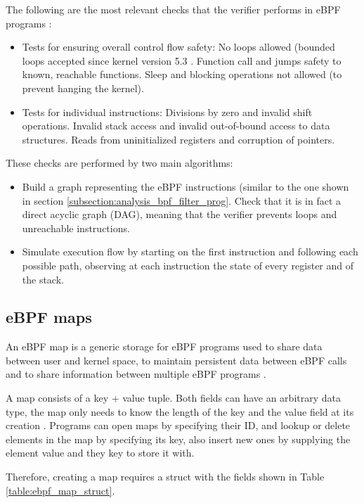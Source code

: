 The following are the most relevant checks that the verifier performs in eBPF programs \cite{ebpf_verifier_kerneldocs} \cite{ebpf_JIT_demystify_page17-22}:
\begin{itemize}
\item Tests for ensuring overall control flow safety:
	\subitem No loops allowed (bounded loops accepted since kernel version 5.3 \cite{ebpf_bounded_loops}.
	\subitem Function call and jumps safety to known, reachable functions.
	\subitem Sleep and blocking operations not allowed (to prevent hanging the kernel).
\item Tests for individual instructions:
	 \subitem Divisions by zero and invalid shift operations.
	 \subitem Invalid stack access and invalid out-of-bound access to data structures.
	 \subitem Reads from uninitialized registers and corruption of pointers.
\end{itemize}

These checks are performed by two main algorithms:
\begin{itemize}
\item Build a graph representing the eBPF instructions (similar to the one shown in section \ref{subsection:analysis_bpf_filter_prog}. Check that it is in fact a direct acyclic graph (DAG), meaning that the verifier prevents loops and unreachable instructions.
\item Simulate execution flow by starting on the first instruction and following each possible path, observing at each instruction the state of every register and of the stack.
\end{itemize}

\subsection{eBPF maps} \label{subsection:ebpf_maps}
An eBPF map is a generic storage for eBPF programs used to share data between user and kernel space, to maintain persistent data between eBPF calls and to share information between multiple eBPF programs \cite{ebpf_maps_kernel}.

A map consists of a key + value tuple. Both fields can have an arbitrary data type, the map only needs to know the length of the key and the value field at its creation \cite{bpf_syscall}. Programs can open maps by specifying their ID, and lookup or delete elements in the map by specifying its key, also insert new ones by supplying the element value and they key to store it with.

Therefore, creating a map requires a struct with the fields shown in Table \ref{table:ebpf_map_struct}.

